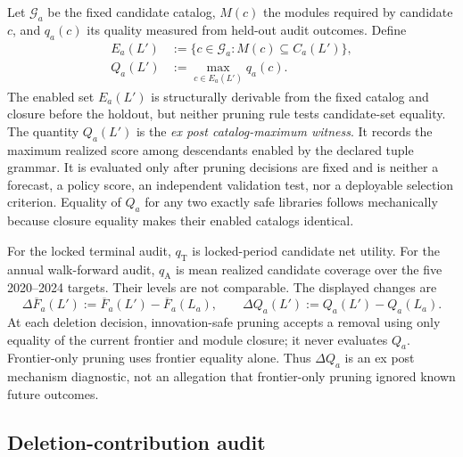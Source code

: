 Let \(\mathcal G_a\) be the fixed candidate catalog, \(M(c)\) the modules
required by candidate \(c\), and \(q_a(c)\) its quality measured from held-out
audit outcomes.  Define
\begin{align}
  E_a(L')&:=\{c\in\mathcal G_a:M(c)\subseteq C_a(L')\},\nonumber\\
  Q_a(L')&:=\max_{c\in E_a(L')}q_a(c).
  \label{eq:supp-financial-descendant-quality}
\end{align}
The enabled set \(E_a(L')\) is structurally derivable from the fixed catalog
and closure before the holdout, but neither pruning rule tests candidate-set
equality. The quantity \(Q_a(L')\) is the \emph{ex post catalog-maximum
witness}. It records the maximum realized score among descendants enabled by
the declared tuple grammar. It is evaluated only after pruning decisions are
fixed and is neither a forecast, a policy score, an independent validation
test, nor a deployable selection criterion. Equality of \(Q_a\) for any two
exactly safe libraries follows mechanically because closure equality makes
their enabled catalogs identical.

For the locked terminal audit, \(q_{\mathrm T}\) is locked-period candidate net
utility.  For the annual walk-forward audit, \(q_{\mathrm A}\) is mean realized
candidate coverage over the five 2020--2024 targets.  Their levels are not
comparable.  The displayed changes are
\[
  \Delta\overline F_a(L'):=\overline F_a(L')-\overline F_a(L_a),
  \qquad
  \Delta Q_a(L'):=Q_a(L')-Q_a(L_a).
\]
At each deletion decision, innovation-safe pruning accepts a removal using
only equality of the current frontier and module closure; it never evaluates
\(Q_a\).  Frontier-only pruning uses frontier equality alone.  Thus
\(\Delta Q_a\) is an ex post mechanism diagnostic, not an allegation that
frontier-only pruning ignored known future outcomes.

\subsection{Deletion-contribution audit}

